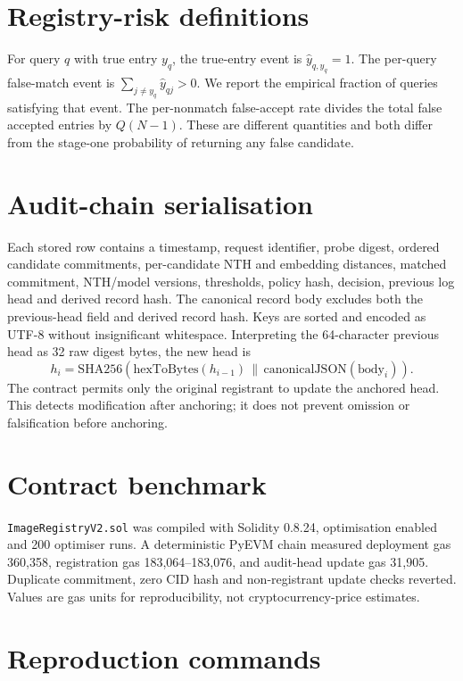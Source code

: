 \documentclass[11pt]{article}
\begin{document}
\section{Registry-risk definitions}

For query $q$ with true entry $y_q$, the true-entry event is $\widehat y_{q,y_q}=1$. The per-query false-match event is $\sum_{j\ne y_q}\widehat y_{qj}>0$. We report the empirical fraction of queries satisfying that event. The per-nonmatch false-accept rate divides the total false accepted entries by $Q(N-1)$. These are different quantities and both differ from the stage-one probability of returning any false candidate.

\section{Audit-chain serialisation}

Each stored row contains a timestamp, request identifier, probe digest, ordered candidate commitments, per-candidate NTH and embedding distances, matched commitment, NTH/model versions, thresholds, policy hash, decision, previous log head and derived record hash. The canonical record body excludes both the previous-head field and derived record hash. Keys are sorted and encoded as UTF-8 without insignificant whitespace. Interpreting the 64-character previous head as 32 raw digest bytes, the new head is
\[
 h_i=\mathrm{SHA256}(\mathrm{hexToBytes}(h_{i-1})\,\|\,\mathrm{canonicalJSON}(\mathrm{body}_i)).
\]
The contract permits only the original registrant to update the anchored head. This detects modification after anchoring; it does not prevent omission or falsification before anchoring.

\section{Contract benchmark}

\texttt{ImageRegistryV2.sol} was compiled with Solidity 0.8.24, optimisation enabled and 200 optimiser runs. A deterministic PyEVM chain measured deployment gas 360,358, registration gas 183,064--183,076, and audit-head update gas 31,905. Duplicate commitment, zero CID hash and non-registrant update checks reverted. Values are gas units for reproducibility, not cryptocurrency-price estimates.

\section{Reproduction commands}
\end{document}
